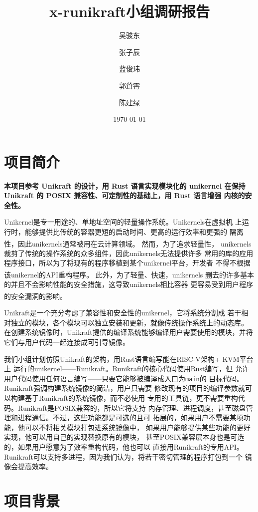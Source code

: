 \documentclass[UTF8,fontset=none,linespread=1.15]{ctexart}
\let\nosupcite\cite
\renewcommand*{\cite}[1]{\textsuperscript{\nosupcite{#1}}}
\begin{document}
\sffamily %
\title{\bfseries x-runikraft小组\quad 调研报告}
\author{吴骏东\and 张子辰\and 蓝俊玮\and 郭耸霄\and 陈建绿}
\date{\today}
\maketitle

\tableofcontents

\section{项目简介}
\textbf{本项目参考 Unikraft 的设计，用 Rust 语言实现模块化的 unikernel
在保持 Unikraft 的 POSIX 兼容性、可定制性的基础上，用 Rust 语言增强
内核的安全性。}

Unikernel是专一用途的、单地址空间的轻量操作系统。Unikernels在虚拟机
上运行时，能够提供比传统的容器更短的启动时间、更高的运行效率和更强的
隔离性，因此unikernels通常被用在云计算领域。\cite{bib:unikernel}
然而，为了追求轻量性，
unikernels裁剪了传统的操作系统的众多组件，因此unikernels无法提供许多
常用的库的应用程序接口，所以为了将现有的程序移植到某个unikernel平台，开发者
不得不根据该unikernel的API重构程序。\cite{bib:unikraft}
此外，为了轻量、快速，unikernels
删去的许多基本的并且不会影响性能的安全措施，这导致unikernels相比容器
更容易受到用户程序的安全漏洞的影响。\cite{bib:unikernel-secuirty}

Unikraft是一个充分考虑了兼容性和安全性的unikernel，它将系统分割成
若干相对独立的模块，各个模块可以独立安装和更新，就像传统操作系统上的动态库。
在创建系统镜像时，Unikraft提供的编译系统能够编译用户需要使用的模块，并将
它们与用户代码一起连接成可引导镜像。

我们小组计划仿照Unikraft的架构，用Rust语言编写能在RISC-V架构+ KVM平台上
运行的unikernel——Runikraft。Runikraft的核心代码使用Rust编写，但
允许用户代码使用任何语言编写——只要它能够被编译成入口为\texttt{main}的
目标代码。Runikraft强调构建系统镜像的简洁，用户只需要
修改现有的项目的编译参数就可以构建基于Runikraft的系统镜像，而不必使用
专用的工具链，更不需要重构代码。Runikraft是POSIX兼容的，所以它将支持
内存管理、进程调度，甚至磁盘管理和进程通信。不过，这些功能都是可选的且可
拓展的，如果用户不需要某项功能，他可以不将相关模块打包进系统镜像中，
如果用户能够提供某些功能的更好实现，他可以用自己的实现替换原有的模块，
甚至POSIX兼容层本身也是可选的，如果用户愿意为了效率重构代码，他也可以
直接用Runikraft的专用API。
Runikraft可以支持多进程，因为我们认为，将若干密切管理的程序打包到一个
镜像会提高效率。
\section{项目背景}
\end{document}
